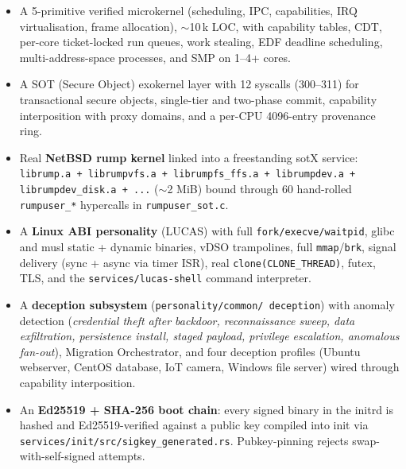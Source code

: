\documentclass[11pt,a4paper]{article}
\begin{document}
\begin{itemize}[leftmargin=1.4em,itemsep=0.3em]
  \item A 5-primitive verified microkernel
        (scheduling, IPC, capabilities, IRQ virtualisation, frame
        allocation), $\sim$10\,k LOC, with capability tables, CDT,
        per-core ticket-locked run queues, work stealing, EDF
        deadline scheduling, multi-address-space processes, and SMP
        on 1--4+ cores.

  \item A SOT (Secure Object) exokernel layer with 12 syscalls
        (300--311) for transactional secure objects, single-tier and
        two-phase commit, capability interposition with proxy
        domains, and a per-CPU 4096-entry provenance ring.

  \item Real \textbf{NetBSD rump kernel} linked into a freestanding
        sotX service: \texttt{librump.a + librumpvfs.a +
        librumpfs\_ffs.a + librumpdev.a + librumpdev\_disk.a + ...}
        ($\sim$2 MiB) bound through 60 hand-rolled \texttt{rumpuser\_*}
        hypercalls in \texttt{rumpuser\_sot.c}.

  \item A \textbf{Linux ABI personality} (LUCAS) with full
        \texttt{fork/execve/waitpid}, glibc and musl static + dynamic
        binaries, vDSO trampolines, full \texttt{mmap}/\texttt{brk},
        signal delivery (sync + async via timer ISR), real
        \texttt{clone(CLONE\_THREAD)}, futex, TLS, and the
        \texttt{services/lucas-shell} command interpreter.

  \item A \textbf{deception subsystem} (\texttt{personality/common/
        deception}) with anomaly detection (\textit{credential theft
        after backdoor, reconnaissance sweep, data exfiltration,
        persistence install, staged payload, privilege escalation,
        anomalous fan-out}), Migration Orchestrator, and four
        deception profiles (Ubuntu webserver, CentOS database, IoT
        camera, Windows file server) wired through capability
        interposition.

  \item An \textbf{Ed25519 + SHA-256 boot chain}: every signed
        binary in the initrd is hashed and Ed25519-verified against
        a public key compiled into init via
        \texttt{services/init/src/sigkey\_generated.rs}.
        Pubkey-pinning rejects swap-with-self-signed attempts.


\end{itemize}
\end{document}
